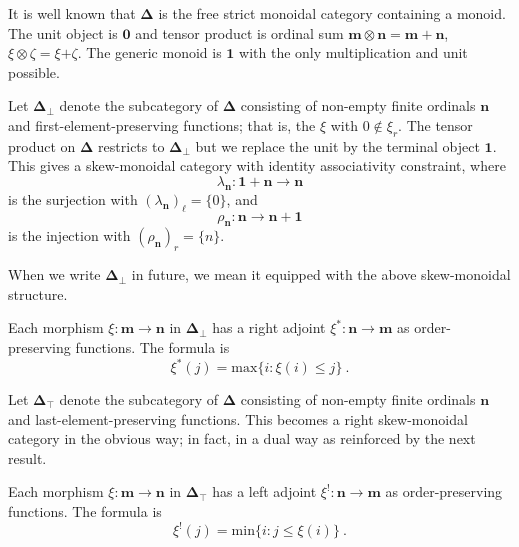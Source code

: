 \documentclass[a4paper,12pt,reqno]{amsart}
\theoremstyle{definition}
\theoremstyle{fact}
\theoremstyle{genquest}
\theoremstyle{step}
\newcommand{\lra}{\longrightarrow}
\begin{document}
It is well known \cite{osed} that $\mathbf{\Delta}$ is the free strict monoidal category containing a monoid.
The unit object is $\mathbf{0}$ and tensor product is ordinal sum $\mathbf{m}\otimes \mathbf{n} = \mathbf{m+n}$, $\xi\otimes \zeta = \xi \mathbf{+} \zeta$.
The generic monoid is $\mathbf{1}$ with the only multiplication and unit possible.

Let $\mathbf{\Delta}_{\bot}$ denote the subcategory of $\mathbf{\Delta}$ consisting of non-empty finite ordinals $\mathbf{n}$
and first-element-preserving functions; that is, the $\xi$ with $0\notin \xi_r$.
The tensor product on 
$\mathbf{\Delta}$ restricts to $\mathbf{\Delta}_{\bot}$ 
but we replace the unit by the terminal object $\mathbf{1}$.
This gives a skew-monoidal category with identity associativity constraint, where 
$$\lambda_{\mathbf{n}} : \mathbf{1+n} \lra \mathbf{n}$$ is the surjection with 
$(\lambda_{\mathbf{n}})_{\ell} = \{0\}$, and 
$$\rho_{\mathbf{n}} : \mathbf{n} \lra \mathbf{n+1}$$ is the injection with
$(\rho_{\mathbf{n}})_{r} = \{n\}$.

When we write $\mathbf{\Delta}_{\bot}$ in future, we mean it equipped with the above skew-monoidal structure. 

Each morphism $\xi : \mathbf{m}\lra \mathbf{n}$ in $\mathbf{\Delta}_{\bot}$
has a right adjoint $\xi^* : \mathbf{n}\lra \mathbf{m}$ as order-preserving functions. 
The formula is
\begin{equation}\label{radj}
\xi^*(j) = \mathrm{max}\{i : \xi(i) \le j \} \ .
\end{equation}

Let $\mathbf{\Delta}_{\top}$ denote the subcategory of $\mathbf{\Delta}$ consisting of non-empty finite ordinals $\mathbf{n}$
and last-element-preserving functions.
This becomes a right skew-monoidal category in the obvious way; in fact, in a dual way as reinforced by the next result.

Each morphism $\xi : \mathbf{m}\lra \mathbf{n}$ in $\mathbf{\Delta}_{\top}$
has a left adjoint $\xi^! : \mathbf{n}\lra \mathbf{m}$ as order-preserving functions. 
The formula is
\begin{equation}\label{ladj}
\xi^!(j) = \mathrm{min}\{i : j \le \xi(i) \} \ .
\end{equation}
\end{document}
